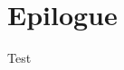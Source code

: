 \documentclass[a6paper, parskip=half, DIV=14, 12pt]{scrartcl}
\begin{document}
\section*{Epilogue}
Test

%
%
%
%
%
%
%
%
%
%
%
%
%
%
%
%
%
%
%
%
\end{document}
